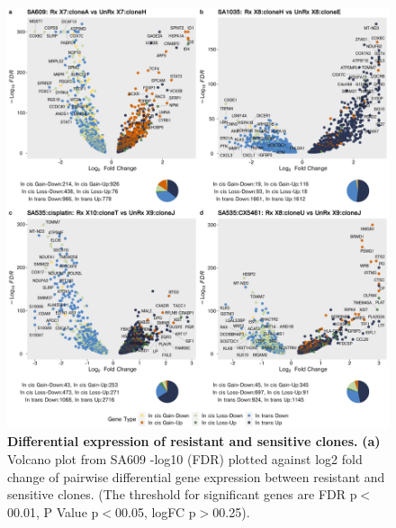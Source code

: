 
\begin{figure}
\centering
  \includegraphics[width=\textwidth]{Figures/chap5/Volcanoes4plots.png}
\caption[DE of resistant and sensitive clonealign defined clones]
	{\small
	\textbf{Differential expression of resistant and sensitive clones.}
	\textbf{(a)} Volcano plot from SA609 -log10 (FDR) plotted against log2 fold change of pairwise differential gene expression between resistant and sensitive clones. (The threshold for significant genes are FDR p$<$00.01, P Value p$<$00.05, logFC p$>$00.25).
	   }
	\label{fig:Volcanoes4plots}
 \end{figure}


